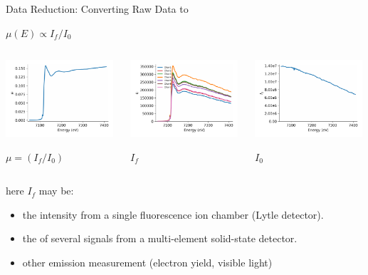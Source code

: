 \begin{slide}{Data Reduction: Converting Raw Data to  {\mue}  }
\begin{cenpage}{145mm}
{{   }}

 { {

    {}   $ \mu(E) \propto I_f / I_0 $

    \vmm
    \begin{columns}
      \begin{column}{40mm}
        \includegraphics[width=40mm]{figs/experiment/mu_fluor}

        \hspace{15mm}        $\mu = (I_f/I_0)$
      \end{column}
      \begin{column}{40mm}
        \includegraphics[width=40mm]{figs/experiment/if_multi}

        \hspace{15mm}        $I_f$
      \end{column}
      \begin{column}{40mm}
        \includegraphics[width=40mm]{figs/experiment/i0_fluor}

        \hspace{15mm}        $I_0$
       \end{column}
     \end{columns}

 \vmm\vmm


 here $I_f$ may be:

 \begin{itemize}
 \item  the intensity from a single fluorescence ion chamber (Lytle detector).
 \item  the {} of several signals from a multi-element solid-state detector.
 \item  other emission measurement (electron yield, visible light)
 \end{itemize}

}}
\end{cenpage}
\end{slide}
